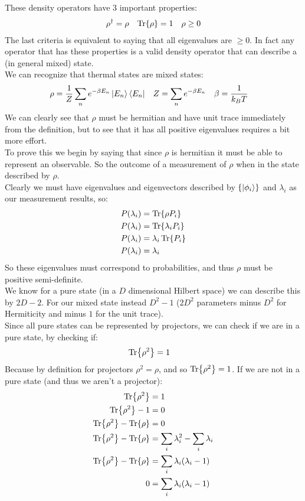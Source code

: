 These density operators have 3 important properties:
\begin{align*}
	\rho^\dagger &= \rho &
	\Tr{\rho} &= 1 &
	\rho \geq 0
\end{align*}
The last criteria is equivalent to saying that all eigenvalues are $\geq 0$. In fact any operator that has these properties is a valid density operator that can describe a (in general mixed) state. \\
We can recognize that thermal states are mixed states:
\begin{align*}
	\rho &= \frac{1}{Z} \sum_n e^{-\beta E_n} \ket{E_n}\bra{E_n} &
	Z &= \sum_n e^{-\beta E_n} &
	\beta &= \frac{1}{k_B T}
\end{align*}
We can clearly see that $\rho$ must be hermitian and have unit trace immediately from the definition, but to see that it has all positive eigenvalues requires a bit more effort.\\
To prove this we begin by saying that since $\rho$ is hermitian it must be able to represent an observable. So the outcome of a measurement of $\rho$ when in the state described by $\rho$. \\
Clearly we must have eigenvalues and eigenvectors described by $\{\ket{\phi_i}\}$ and $\lambda_i$ as our measurement results, so:
\begin{align*}
	P(\lambda_i) &= \Tr{\rho P_i} \\
	P(\lambda_i) &= \Tr{\lambda_i P_i} \\
	P(\lambda_i) &= \lambda_i \Tr{P_i} \\
	P(\lambda_i) &= \lambda_i
\end{align*}
So these eigenvalues must correspond to probabilities, and thus $\rho$ must be positive semi-definite. \\
We know for a pure state (in a $D$ dimensional Hilbert space) we can describe this by $2D-2$. For our mixed state instead $D^2 -1$ ($2D^2$ parameters minus $D^2$ for Hermiticity and minus $1$ for the unit trace).\\
Since all pure states can be represented by projectors, we can check if we are in a pure state, by checking if:
\begin{align*}
	\Tr{\rho^2} &= 1
\end{align*}
Because by definition for projectors $\rho^2 = \rho$, and so $\Tr{\rho^2} =1$. If we are not in a pure state (and thus we aren't a projector):
\begin{align*}
	\Tr{\rho^2} &= 1 \\
	\Tr{\rho^2} - 1 &= 0 \\
	\Tr{\rho^2} - \Tr{\rho} &= 0 \\
	\Tr{\rho^2} -\Tr{\rho} &= \sum_i \lambda_i^2 -\sum_i\lambda_i\\
	\Tr{\rho^2} -\Tr{\rho}&= \sum_i \lambda_i(\lambda_i -1) \\
	0 &= \sum_i \lambda_i(\lambda_i -1)
\end{align*}
